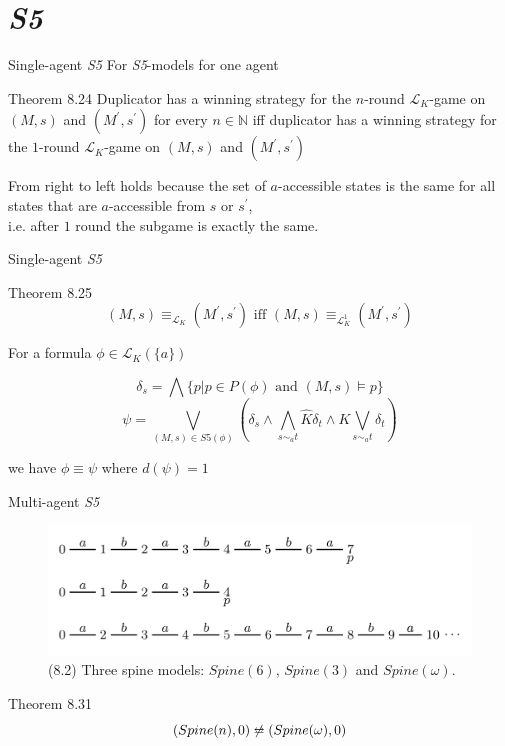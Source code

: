 \documentclass{beamer}
\newcommand{\lang}{\mathcal{L}}
\begin{document}
\section*{\textit{S5}}

\begin{frame}{Single-agent \textit{S5}}
	For \textit{S5}-models for one agent
	\begin{block}{Theorem 8.24}
		Duplicator has a winning strategy for the $n$-round $\lang_K$-game on $(M,s)$ and $(M^\prime,s^\prime)$ for every $n \in \mathbb{N}$ iff duplicator has a winning strategy for the $1$-round $\lang_K$-game on $(M,s)$ and $(M^\prime,s^\prime)$
	\end{block} \pause
	From right to left holds because the set of $a$-accessible states is the same for all states that are $a$-accessible from $s$ or $s^\prime$,\\
	i.e. after $1$ round the subgame is exactly the same.
\end{frame}

\begin{frame}{Single-agent \textit{S5}}
	\begin{block}{Theorem 8.25}
		\[(M,s) \equiv_{\lang_K} (M^\prime,s^\prime) \text{ iff } (M,s) \equiv_{\lang_K^1} (M^\prime,s^\prime)\]
	\end{block} \pause
	For a formula $\phi \in \lang_K(\{a\})$
	
	\[\delta_s = \bigwedge \{p | p \in P(\phi) \text{ and } (M,s) \models p\}\]
	\[
		\psi = \bigvee_{(M,s) \in S5(\phi)} \left( \delta_s \wedge \bigwedge_{s \sim_a t} \hat{K} \delta_t \wedge K \bigvee_{s \sim_a t} \delta_t \right)
	\] \pause
	
	we have $\phi \equiv \psi$ where $d(\psi) = 1$
\end{frame}

\begin{frame}{Multi-agent \textit{S5}}
	\begin{figure}[h]
		\includegraphics[width=1\textwidth]{figure_8_2_spine_models}
		\caption{(8.2) Three spine models: $Spine(6)$, $Spine(3)$ and $Spine(\omega)$.}
	\end{figure} \pause
	\begin{block}{Theorem 8.31}
		\[(Spine(n),0) \not\leftrightarroweq (Spine(\omega),0)\]
	\end{block}
\end{frame}
\end{document}
